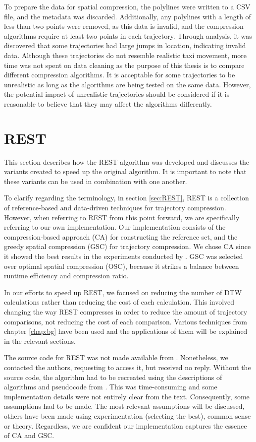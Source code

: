 To prepare the data for spatial compression, the polylines were written to a CSV file, and the metadata was discarded. Additionally, any polylines with a length of less than two points were removed, as this data is invalid, and the compression algorithms require at least two points in each trajectory. Through analysis, it was discovered that some trajectories had large jumps in location, indicating invalid data. Although these trajectories do not resemble realistic taxi movement, more time was not spent on data cleaning as the purpose of this thesis is to compare different compression algorithms. It is acceptable for some trajectories to be unrealistic as long as the algorithms are being tested on the same data. However, the potential impact of unrealistic trajectories should be considered if it is reasonable to believe that they may affect the algorithms differently.

\section{REST}
This section describes how the REST algorithm was developed and discusses the variants created to speed up the original algorithm. It is important to note that these variants can be used in combination with one another.

To clarify regarding the terminology, in section \ref{sec:REST}, REST is a collection of reference-based and data-driven techniques for trajectory compression. However, when referring to REST from this point forward, we are specifically referring to our own implementation. Our implementation consists of the compression-based approach (CA) for constructing the reference set, and the greedy spatial compression (GSC) for trajectory compression. We chose CA since it showed the best results in the experiments conducted by \textcite{zhao2018rest}. GSC was selected over optimal spatial compression (OSC), because it strikes a balance between runtime efficiency and compression ratio.

In our efforts to speed up REST, we focused on reducing the number of DTW calculations rather than reducing the cost of each calculation. This involved changing the way REST compresses in order to reduce the amount of trajectory comparisons, not reducing the cost of each comparison. Various techniques from chapter \ref{chap:bg} have been used and the applications of them will be explained in the relevant sections.

The source code for REST was not made available from \textcite{zhao2018rest}. Nonetheless, we contacted the authors, requesting to access it, but received no reply. Without the source code, the algorithm had to be recreated using the descriptions of algorithms and pseudocode from \textcite{zhao2018rest}. This was time-consuming and some implementation details were not entirely clear from the text. Consequently, some assumptions had to be made. The most relevant assumptions will be discussed, others have been made using experimentation (selecting the best), common sense or theory. Regardless, we are confident our implementation captures the essence of CA and GSC.

